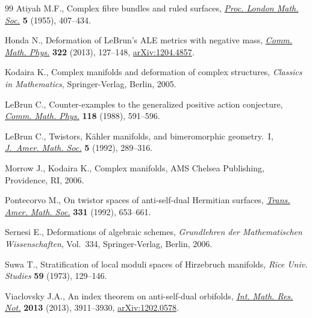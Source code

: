 \documentclass[11pt]{article}
\numberwithin{equation}{section}
\begin{document}
\begin{thebibliography}{99}
Atiyah M.F., Complex f\/ibre bundles and ruled surfaces, \href{http://dx.doi.org/10.1112/plms/s3-5.4.407}{\textit{Proc. London
  Math. Soc.}} \textbf{5} (1955), 407--434.

Honda N., Deformation of {L}e{B}run's {ALE} metrics with negative mass,
  \href{http://dx.doi.org/10.1007/s00220-012-1656-z}{\textit{Comm. Math. Phys.}} \textbf{322} (2013), 127--148, \href{http://arxiv.org/abs/1204.4857}{arXiv:1204.4857}.

Kodaira K., Complex manifolds and deformation of complex structures, \textit{Classics
  in Mathematics}, Springer-Verlag, Berlin, 2005.

LeBrun C., Counter-examples to the generalized positive action conjecture,
  \href{http://dx.doi.org/10.1007/BF01221110}{\textit{Comm. Math. Phys.}} \textbf{118} (1988), 591--596.

LeBrun C., Twistors, {K}\"ahler manifolds, and bimeromorphic geometry.~{I},
  \href{http://dx.doi.org/10.2307/2152769}{\textit{J.~Amer. Math. Soc.}} \textbf{5} (1992), 289--316.

Morrow J., Kodaira K., Complex manifolds, AMS Chelsea Publishing, Providence,
  RI, 2006.

Pontecorvo M., On twistor spaces of anti-self-dual {H}ermitian surfaces,
  \href{http://dx.doi.org/10.2307/2154133}{\textit{Trans. Amer. Math. Soc.}} \textbf{331} (1992), 653--661.

Sernesi E., Deformations of algebraic schemes, \textit{Grundlehren der
  Mathematischen Wissenschaften}, Vol.~334, Springer-Verlag, Berlin, 2006.

Suwa T., Stratif\/ication of local moduli spaces of {H}irzebruch manifolds,
  \textit{Rice Univ. Studies} \textbf{59} (1973), 129--146.

Viaclovsky J.A., An index theorem on anti-self-dual orbifolds, \href{http://dx.doi.org/10.1093/imrn/rns160}{\textit{Int.
  Math. Res. Not.}} \textbf{2013} (2013), 3911--3930, \href{http://arxiv.org/abs/1202.0578}{arXiv:1202.0578}.

\end{thebibliography}
\end{document}
